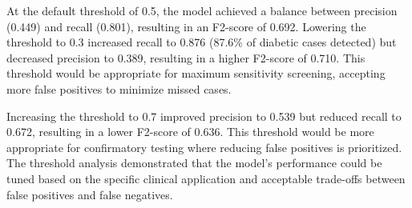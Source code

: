 At the default threshold of 0.5, the model achieved a balance between precision (0.449) and recall (0.801), resulting in an F2-score of 0.692. Lowering the threshold to 0.3 increased recall to 0.876 (87.6\% of diabetic cases detected) but decreased precision to 0.389, resulting in a higher F2-score of 0.710. This threshold would be appropriate for maximum sensitivity screening, accepting more false positives to minimize missed cases.

Increasing the threshold to 0.7 improved precision to 0.539 but reduced recall to 0.672, resulting in a lower F2-score of 0.636. This threshold would be more appropriate for confirmatory testing where reducing false positives is prioritized. The threshold analysis demonstrated that the model's performance could be tuned based on the specific clinical application and acceptable trade-offs between false positives and false negatives.